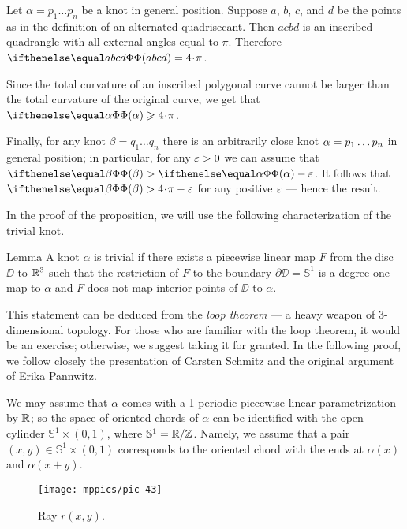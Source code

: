 Let $\alpha=p_1\dots p_n$ be a knot in general position.
Suppose $a$, $b$, $c$, and $d$ be the points as in the definition of an alternated quadrisecant.
Then $acbd$ is an inscribed quadrangle with all external angles equal to $\pi$.
Therefore $\tc{abcd}=4\cdot\pi$.

Since the total curvature of an inscribed polygonal curve cannot be larger than the total curvature of the original curve, we get that $\tc{\alpha}\z\ge 4\cdot\pi$.

Finally, for any knot $\beta=q_1\dots q_n$ there is an arbitrarily close knot $\alpha\z=p_1\dots p_n$ in general position;
in particular, for any $\varepsilon>0$ we can assume that $\tc{\beta}>\tc\alpha-\eps$.
It follows that $\tc{\beta}>4\cdot\pi-\eps$ for any positive $\varepsilon$ --- hence the result.
\qeds

In the proof of the proposition, we will use the following characterization of the trivial knot.

\begin{thm}{Lemma}
A knot $\alpha$ is trivial if there exists a piecewise linear map $F$ from the disc $\DD$ to $\mathbb{R}^3$ such that the  restriction of $F$ to the boundary $\partial\DD=\mathbb{S}^1$ is a degree-one map to $\alpha$ and $F$ does not map interior points of $\DD$ to $\alpha$.
\end{thm}

This statement can be deduced from  the \textit{loop theorem} --- a heavy weapon of 3-dimensional topology.
For those who are familiar with the loop theorem, it would be an exercise; otherwise, we suggest taking it for granted.
In the following proof, we follow closely the presentation of Carsten Schmitz \cite{schmitz} and the original argument of Erika Pannwitz.

We may assume that $\alpha$ comes with a 1-periodic piecewise linear parametrization by $\mathbb{R}$;
so the space of oriented chords of $\alpha$ can be identified with the open cylinder $\mathbb{S}^1\times (0,1)$, where $\mathbb{S}^1=\mathbb{R}/\mathbb{Z}$.
Namely, we assume that a pair $(x,y)\in \mathbb{S}^1\times (0,1)$ corresponds to the oriented chord with the ends at $\alpha(x)$ and $\alpha(x+y)$.

\begin{wrapfigure}[7]{r}{42 mm}
\vskip-6mm
\centering
\texttt{[image: mppics/pic-43]}
\caption*{Ray $r(x,y)$.}
\vskip0mm
\end{wrapfigure}


